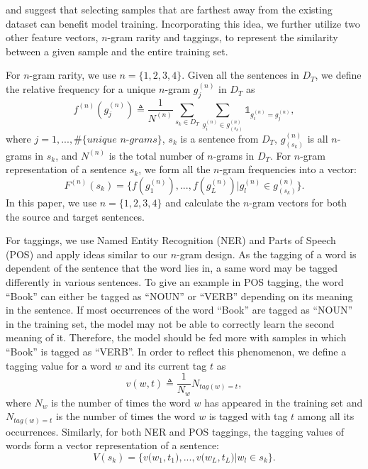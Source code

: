 \documentclass[letterpaper]{article}
\begin{document}
\cite{yang2015multi} and \cite{sener2018active} suggest that selecting samples that are farthest away from the existing dataset can benefit model training.
Incorporating this idea, we further utilize two other feature vectors, $n$-gram rarity and taggings, to represent the similarity between a given sample and the entire training set.

For $n$-gram rarity, we use $n=\{1,2,3,4\}$. Given all the sentences in $D_T$, we define the relative frequency for a unique $n$-gram $g^{(n)}_j$ in $D_T$ as
\begin{equation}
	\label{eq:ngram}
	f^{(n)}(g^{(n)}_j) \triangleq \frac{1}{N^{(n)}} \sum_{s_k \in D_T} \sum_{g^{(n)}_i \in g^{(n)}_{(s_k)}} \mathds{1}_{g^{(n)}_i=g^{(n)}_j},
\end{equation}
where $j=1,...,\#\textit{\{unique n-grams\}}$, $s_k$ is a sentence from $D_T$, $g^{(n)}_{(s_k)}$ is all $n$-grams in $s_k$, and $N^{(n)}$ is the total number of $n$-grams in $D_T$. For $n$-gram representation of a sentence $s_k$, we form all the $n$-gram frequencies into a vector:
\begin{equation}
	\label{eq:ngramSent}
	F^{(n)}(s_k) = \{f(g^{(n)}_1),...,f(g^{(n)}_L)|g^{(n)}_l \in g^{(n)}_{(s_k)}\}.
\end{equation}
In this paper, we use $n=\{1,2,3,4\}$ and calculate the $n$-gram vectors for both the source and target sentences.

For taggings, we use Named Entity Recognition (NER) and Parts of Speech (POS) and apply ideas similar to our $n$-gram design. As the tagging of a word is dependent of the sentence that the word lies in, a same word may be tagged differently in various sentences. To give an example in POS tagging, the word ``Book'' can either be tagged as ``NOUN'' or ``VERB'' depending on its meaning in the sentence. If most occurrences of the word ``Book'' are tagged as ``NOUN'' in the training set, the model may not be able to correctly learn the second meaning of it. Therefore, the model should be fed more with samples in which ``Book'' is tagged as ``VERB''. In order to reflect this phenomenon, we define a tagging value for a word $w$ and its current tag $t$ as
\begin{equation}
	\label{eq:tagging}
	v(w,t) \triangleq \frac{1}{N_w} N_{tag(w)=t},
\end{equation}
where $N_w$ is the number of times the word $w$ has appeared in the training set and $N_{tag(w)=t}$ is the number of times the word $w$ is tagged with tag $t$ among all its occurrences.
Similarly, for both NER and POS taggings, the tagging values of words form a vector representation of a sentence:
\begin{equation}
	\label{eq:taggingSent}
	V(s_k) = \Big\{v\Big(w_1,t_1\Big),...,v\Big(w_L,t_L\Big)|w_l \in s_k\Big\}.
\end{equation}
\end{document}

